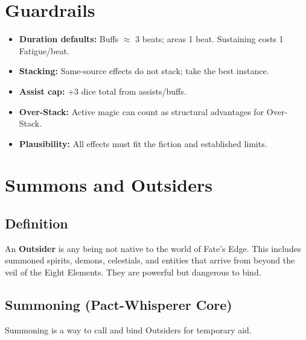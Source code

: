 \section{Guardrails}
\label{sec:magic-guardrails}

\begin{itemize}
\item \textbf{Duration defaults:} Buffs $\approx$ 3 beats; areas 1 beat. Sustaining costs 1 Fatigue/beat.
\item \textbf{Stacking:} Same-source effects do not stack; take the best instance.
\item \textbf{Assist cap:} +3 dice total from assists/buffs.
\item \textbf{Over-Stack:} Active magic can count as structural advantages for Over-Stack.
\item \textbf{Plausibility:} All effects must fit the fiction and established limits.
\end{itemize}



\floatbarrier
\clearpage

\section{Summons and Outsiders}

\subsection{Definition}
An \textbf{Outsider} is any being not native to the world of Fate's Edge. This includes summoned spirits, demons, celestials, and entities that arrive from beyond the veil of the Eight Elements. They are powerful but dangerous to bind.

\subsection{Summoning (Pact-Whisperer Core)}
Summoning is a way to call and bind Outsiders for temporary aid.

